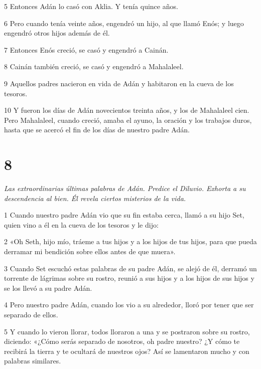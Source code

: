 \par 5 Entonces Adán lo casó con Aklia. Y tenía quince años.

\par 6 Pero cuando tenía veinte años, engendró un hijo, al que llamó Enós; y luego engendró otros hijos además de él.

\par 7 Entonces Enós creció, se casó y engendró a Cainán.

\par 8 Cainán también creció, se casó y engendró a Mahalaleel.

\par 9 Aquellos padres nacieron en vida de Adán y habitaron en la cueva de los tesoros.

\par 10 Y fueron los días de Adán novecientos treinta años, y los de Mahalaleel cien. Pero Mahalaleel, cuando creció, amaba el ayuno, la oración y los trabajos duros, hasta que se acercó el fin de los días de nuestro padre Adán.

\chapter{8}

\par \textit{Las extraordinarias últimas palabras de Adán. Predice el Diluvio. Exhorta a su descendencia al bien. Él revela ciertos misterios de la vida.}

\par 1 Cuando nuestro padre Adán vio que su fin estaba cerca, llamó a su hijo Set, quien vino a él en la cueva de los tesoros y le dijo:

\par 2 «Oh Seth, hijo mío, tráeme a tus hijos y a los hijos de tus hijos, para que pueda derramar mi bendición sobre ellos antes de que muera».

\par 3 Cuando Set escuchó estas palabras de su padre Adán, se alejó de él, derramó un torrente de lágrimas sobre su rostro, reunió a sus hijos y a los hijos de sus hijos y se los llevó a su padre Adán.

\par 4 Pero nuestro padre Adán, cuando los vio a su alrededor, lloró por tener que ser separado de ellos.

\par 5 Y cuando lo vieron llorar, todos lloraron a una y se postraron sobre su rostro, diciendo: «¿Cómo serás separado de nosotros, oh padre nuestro? ¿Y cómo te recibirá la tierra y te ocultará de nuestros ojos? Así se lamentaron mucho y con palabras similares.

